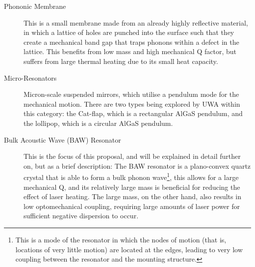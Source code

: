 \documentclass[aps,  
                a4paper, 
                amsmath, 
                amssymb, 
                preprint,
                tightenlines,  
                amsfonts,
                nofootinbib,
                onecolumn,
                titlepage,
                10pt
            ]{revtex4-2}
\begin{document}
    \begin{description}
        \item[Phononic Membrane] This is a small membrane made from an already highly reflective material, in which a lattice of holes are punched into the surface such that they create a mechanical band gap that traps phonons within a defect in the lattice. This benefits from low mass and high mechanical Q factor, but suffers from large thermal heating due to its small heat capacity.
        \item[Micro-Resonators] Micron-scale suspended mirrors, which utilise a pendulum mode for the mechanical motion. There are two types being explored by UWA within this category: the Cat-flap, which is a rectangular AlGaS pendulum, and the lollipop, which is a circular AlGaS pendulum.
        \item[Bulk Acoustic Wave (BAW) Resonator] This is the focus of this proposal, and will be explained in detail further on, but as a brief description: The BAW resonator is a plano-convex quartz crystal that is able to form a bulk phonon wave\footnote{This is a mode of the resonator in which the nodes of motion (that is, locations of very little motion) are located at the edges, leading to very low coupling between the resonator and the mounting structure.}, this allows for a large mechanical Q, and its relatively large mass is beneficial for reducing the effect of laser heating. The large mass, on the other hand, also results in low optomechanical coupling, requiring large amounts of laser power for sufficient negative dispersion to occur.
    \end{description}
    
\end{document}
